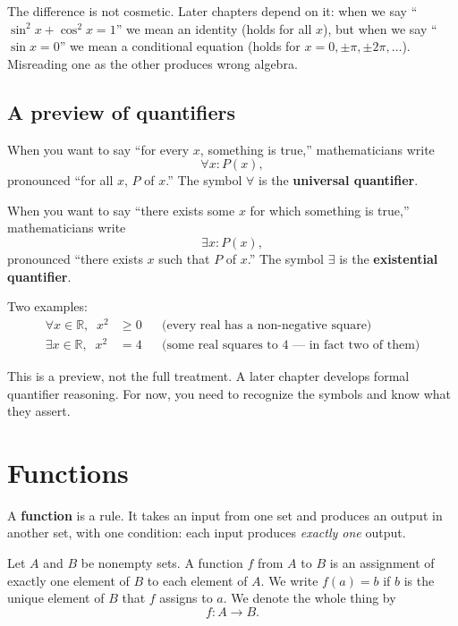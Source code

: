 The difference is not cosmetic. Later chapters depend on it: when we say ``$\sin^2 x + \cos^2 x = 1$'' we mean an identity (holds for all $x$), but when we say ``$\sin x = 0$'' we mean a conditional equation (holds for $x = 0, \pm\pi, \pm 2\pi, \ldots$). Misreading one as the other produces wrong algebra.

\subsection*{A preview of quantifiers}

When you want to say ``for every $x$, something is true,'' mathematicians write
\[
  \forall x \colon P(x),
\]
pronounced ``for all $x$, $P$ of $x$.'' The symbol $\forall$ is the \textbf{universal quantifier}.

When you want to say ``there exists some $x$ for which something is true,'' mathematicians write
\[
  \exists x \colon P(x),
\]
pronounced ``there exists $x$ such that $P$ of $x$.'' The symbol $\exists$ is the \textbf{existential quantifier}.

Two examples:
\begin{align*}
  \forall x \in \mathbb{R}, \;\; x^2 &\geq 0 & &\text{(every real has a non-negative square)} \\
  \exists x \in \mathbb{R}, \;\; x^2 &= 4   & &\text{(some real squares to 4 --- in fact two of them)}
\end{align*}

This is a preview, not the full treatment. A later chapter develops formal quantifier reasoning. For now, you need to recognize the symbols and know what they assert.


\section{Functions}

A \textbf{function} is a rule. It takes an input from one set and produces an output in another set, with one condition: each input produces \emph{exactly one} output.

\begin{definition}
Let $A$ and $B$ be nonempty sets. A function $f$ from $A$ to $B$ is an assignment of exactly one element of $B$ to each element of $A$. We write $f(a) = b$ if $b$ is the unique element of $B$ that $f$ assigns to $a$. We denote the whole thing by
\[
  f \colon A \to B.
\]
\end{definition}

